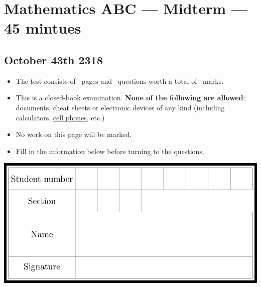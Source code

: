 \documentclass[12pt]{exam}
\begin{document}
\section*{Mathematics ABC --- Midterm --- 45 mintues}
\subsection*{October 43th 2318}
\begin{itemize}
  \item The test consists of \numpages\ pages and \numquestions\ questions worth a total of \numpoints\ marks.
  \item This is a closed-book examination. \textbf{None of the following are allowed}: documents, cheat sheets or electronic devices of any kind (including calculators, \underline{cell phones}, etc.)
  \item No work on this page will be marked.
  \item Fill in the information below before turning to the questions.
\end{itemize}

\begin{center}
  \includegraphics{idBox2}
\end{center}


\vfill
\newpage
\end{document}
